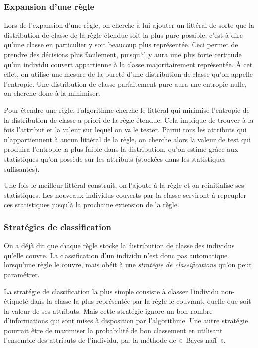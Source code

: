         \subsubsection{Expansion d'une règle}

            Lors de l’expansion d’une règle, on cherche à lui ajouter un littéral de sorte que la distribution de classe de la règle étendue soit la plus pure possible, c’est-à-dire qu’une classe en particulier y soit beaucoup plus représentée. Ceci permet de prendre des décisions plus facilement, puisqu’il y aura une plus forte certitude qu’un individu couvert appartienne à la classe majoritairement représentée. À cet effet, on utilise une mesure de la pureté d’une distribution de classe qu’on appelle l’entropie. Une distribution de classe parfaitement pure aura une entropie nulle, on cherche donc à la minimiser.
            
            Pour étendre une règle, l’algorithme cherche le littéral qui minimise l’entropie de la distribution de classe a priori de la règle étendue. Cela implique de trouver à la fois l’attribut et la valeur sur lequel on va le tester. Parmi tous les attributs qui n’appartiennent à aucun littéral de la règle, on cherche alors la valeur de test qui produira l’entropie la plus faible dans la distribution, qu’on estime grâce aux statistiques qu’on possède sur les attributs (stockées dans les statistiques suffisantes).

            Une fois le meilleur littéral construit, on l’ajoute à la règle et on réinitialise ses statistiques.  Les nouveaux individus couverts par la classe serviront à repeupler ces statistiques jusqu'à la prochaine extension de la règle.

        
        \subsubsection{Stratégies de classification}\label{ssec:nondecisional}
            On a déjà dit que chaque règle stocke la distribution de classe des individus qu'elle couvre. La classification d'un individu n'est donc pas automatique lorsqu'une règle le couvre, mais obéit à une \emph{stratégie de classifications} qu'on peut paramétrer.

            La stratégie de classification la plus simple consiste à classer l’individu non-étiqueté dans la classe la plus représentée par la règle le couvrant, quelle que soit la valeur de ses attributs. Mais cette stratégie ignore un bon nombre d’informations qui sont mises à disposition par l’algorithme. Une autre stratégie pourrait être de maximiser la probabilité de bon classement en utilisant l’ensemble des attributs de l’individu, par la méthode de «~Bayes naïf~».\cite{Gama-VFDR}
            
